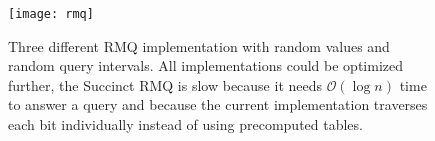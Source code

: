 \documentclass[a4paper,UKenglish,cleveref, autoref, thm-restate]{lipics-v2021}
\begin{document}
\begin{figure}[h]
\caption{Three different RMQ implementation with random values and random query intervals. All implementations could be optimized further,
the Succinct RMQ is slow because it needs $\mathcal{O} (\log n)$ time to answer a query and because the current implementation traverses
each bit individually instead of using precomputed tables.}
\centering
\texttt{[image: rmq]}
\end{figure}



\end{document}
